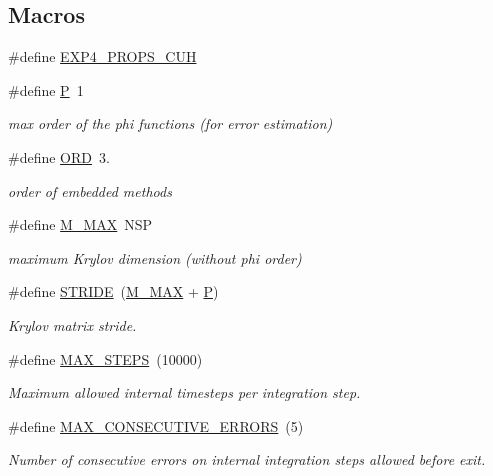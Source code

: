 \subsection*{Macros}
\begin{DoxyCompactItemize}
\item 
\#define \hyperlink{exp4__props_8cuh_a012706e43fb2a3e4102cae6222cccf91}{E\+X\+P4\+\_\+\+P\+R\+O\+P\+S\+\_\+\+C\+UH}
\item 
\#define \hyperlink{exp4__props_8cuh_a2748566f4c443ee77aa831e63dbb5ebe}{P}~1
\begin{DoxyCompactList}\small\item\em max order of the phi functions (for error estimation) \end{DoxyCompactList}\item 
\#define \hyperlink{exp4__props_8cuh_ac5232262b17b940a7b54e6e56439aa24}{O\+RD}~3.
\begin{DoxyCompactList}\small\item\em order of embedded methods \end{DoxyCompactList}\item 
\#define \hyperlink{exp4__props_8cuh_a61819141b0164a35f4d791b0e696721f}{M\+\_\+\+M\+AX}~N\+SP
\begin{DoxyCompactList}\small\item\em maximum Krylov dimension (without phi order) \end{DoxyCompactList}\item 
\#define \hyperlink{exp4__props_8cuh_a351d54267048643c4365f6a24641d0cf}{S\+T\+R\+I\+DE}~(\hyperlink{exprb43__props_8h_a61819141b0164a35f4d791b0e696721f}{M\+\_\+\+M\+AX} + \hyperlink{exprb43__props_8h_a2748566f4c443ee77aa831e63dbb5ebe}{P})
\begin{DoxyCompactList}\small\item\em Krylov matrix stride. \end{DoxyCompactList}\item 
\#define \hyperlink{exp4__props_8cuh_aa0414caef00a64a51d4c6c0711d9e70a}{M\+A\+X\+\_\+\+S\+T\+E\+PS}~(10000)
\begin{DoxyCompactList}\small\item\em Maximum allowed internal timesteps per integration step. \end{DoxyCompactList}\item 
\#define \hyperlink{exp4__props_8cuh_a0f51553c710580b9899756f7ad472c93}{M\+A\+X\+\_\+\+C\+O\+N\+S\+E\+C\+U\+T\+I\+V\+E\+\_\+\+E\+R\+R\+O\+RS}~(5)
\begin{DoxyCompactList}\small\item\em Number of consecutive errors on internal integration steps allowed before exit. \end{DoxyCompactList}\item 

\end{DoxyCompactItemize}
